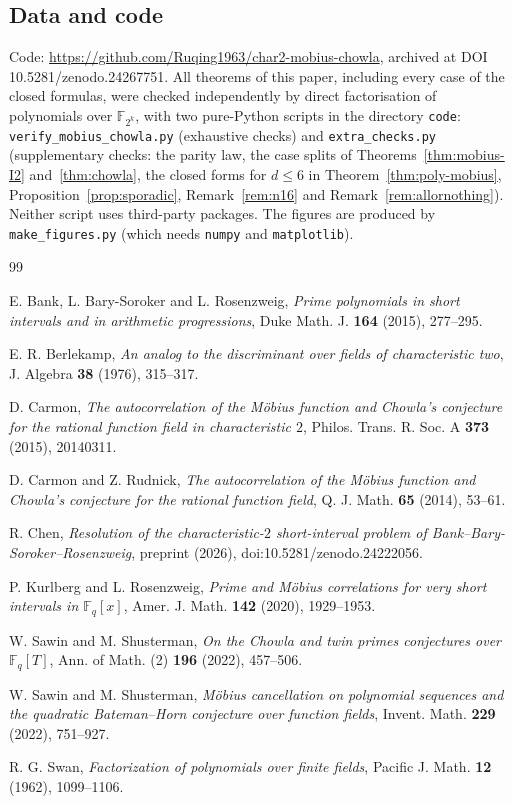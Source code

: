 \documentclass[11pt,a4paper]{amsart}
\theoremstyle{remark}
\numberwithin{equation}{section}
\newcommand{\Fq}{\mathbb{F}_q}
\begin{document}
\subsection*{Data and code}
Code: \url{https://github.com/Ruqing1963/char2-mobius-chowla}, archived at DOI 10.5281/zenodo.24267751.
All theorems of this paper, including every case of the closed formulas, were checked independently by direct
factorisation of polynomials over $\mathbb{F}_{2^k}$, with two pure-Python scripts in the directory \texttt{code}:
\texttt{verify\_mobius\_chowla.py} (exhaustive checks) and \texttt{extra\_checks.py} (supplementary checks: the parity law, the case splits of
Theorems~\ref{thm:mobius-I2} and~\ref{thm:chowla}, the closed forms for $d\le6$ in Theorem~\ref{thm:poly-mobius},
Proposition~\ref{prop:sporadic}, Remark~\ref{rem:n16} and Remark~\ref{rem:allornothing}). Neither script uses third-party packages. The figures are produced by \texttt{make\_figures.py} (which needs
\texttt{numpy} and \texttt{matplotlib}).

\begin{thebibliography}{99}

 E. Bank, L. Bary-Soroker and L. Rosenzweig, \emph{Prime polynomials in short intervals and in arithmetic
progressions}, Duke Math. J. \textbf{164} (2015), 277--295.

 E. R. Berlekamp, \emph{An analog to the discriminant over fields of characteristic two}, J. Algebra
\textbf{38} (1976), 315--317.

 D. Carmon, \emph{The autocorrelation of the M\"obius function and Chowla's conjecture for the rational
function field in characteristic $2$}, Philos. Trans. R. Soc. A \textbf{373} (2015), 20140311.

 D. Carmon and Z. Rudnick, \emph{The autocorrelation of the M\"obius function and Chowla's conjecture for
the rational function field}, Q. J. Math. \textbf{65} (2014), 53--61.

 R. Chen, \emph{Resolution of the characteristic-$2$ short-interval problem of
Bank--Bary-Soroker--Rosenzweig}, preprint (2026), doi:10.5281/zenodo.24222056.

 P. Kurlberg and L. Rosenzweig, \emph{Prime and M\"obius correlations for very short intervals in
$\Fq[x]$}, Amer. J. Math. \textbf{142} (2020), 1929--1953.

 W. Sawin and M. Shusterman, \emph{On the Chowla and twin primes conjectures over $\Fq[T]$}, Ann. of Math.
(2) \textbf{196} (2022), 457--506.

 W. Sawin and M. Shusterman, \emph{M\"obius cancellation on polynomial sequences and the quadratic
Bateman--Horn conjecture over function fields}, Invent. Math. \textbf{229} (2022), 751--927.

 R. G. Swan, \emph{Factorization of polynomials over finite fields}, Pacific J. Math. \textbf{12} (1962),
1099--1106.

\end{thebibliography}
\end{document}
